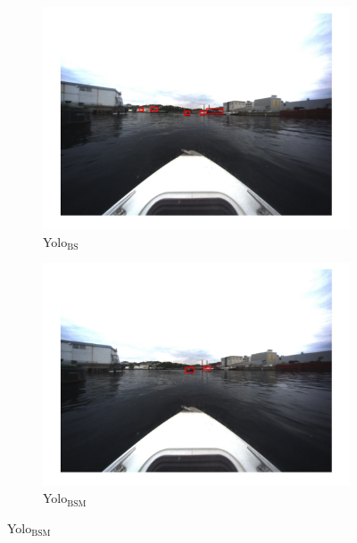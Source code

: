 \begin{figure}[h!]
\centering
\begin{subfigure}[b]{0.6\textwidth}
   \includegraphics[width=1\linewidth]{results/kamsvag/yolo1_figure_1451.jpg}
   \caption{Yolo$_{\text{BS}}$}
\end{subfigure}

\begin{subfigure}[b]{0.6\textwidth}
   \includegraphics[width=1\linewidth]{results/kamsvag/yolo2_figure_1479.jpg}
   \caption{Yolo$_{\text{BSM}}$}
\end{subfigure}


\end{figure}
